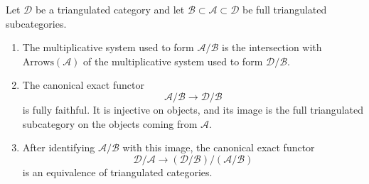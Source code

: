 
\begin{lemma}
\label{lemma-nested-quotients}
Let $\mathcal{D}$ be a triangulated category and let
$\mathcal{B} \subset \mathcal{A} \subset \mathcal{D}$ be full
triangulated subcategories.
\begin{enumerate}
\item The multiplicative system used to form
$\mathcal{A}/\mathcal{B}$ is the intersection with
$\text{Arrows}(\mathcal{A})$ of the multiplicative system used to form
$\mathcal{D}/\mathcal{B}$.
\item The canonical exact functor
$$
\mathcal{A}/\mathcal{B} \longrightarrow \mathcal{D}/\mathcal{B}
$$
is fully faithful. It is injective on objects, and its image is the full
triangulated subcategory on the objects coming from $\mathcal{A}$.
\item After identifying $\mathcal{A}/\mathcal{B}$ with this image, the
canonical exact functor
$$
\mathcal{D}/\mathcal{A} \longrightarrow
(\mathcal{D}/\mathcal{B})/(\mathcal{A}/\mathcal{B})
$$
is an equivalence of triangulated categories.
\end{enumerate}
\end{lemma}


